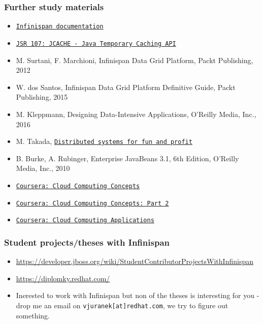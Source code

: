 \documentclass[10pt,utf8]{beamer}
\begin{document}
\begin{frame}
	\frametitle{Further study materials}
	\begin{itemize}
		\item \color{blue}\href{http://infinispan.org/documentation/}{\texttt{Infinispan documentation}}
		\item \href{https://jcp.org/en/jsr/detail?id=107}{\texttt{JSR 107: JCACHE - Java Temporary Caching API}}\color{black}
		\item M. Surtani, F. Marchioni, Infinispan Data Grid Platform,  Packt Publishing, 2012
		\item W. dos Santos, Infinispan Data Grid Platform Definitive Guide, Packt Publishing, 2015
		\item M. Kleppmann, Designing Data-Intensive Applications, O'Reilly Media, Inc., 2016
		\item M. Takada,  \color{blue}\href{http://book.mixu.net/distsys/}{\texttt{Distributed systems for fun and profit}}\color{black}
		\vspace{0.5cm}
		\item  B. Burke, A. Rubinger, Enterprise JavaBeans 3.1, 6th Edition,  O'Reilly Media, Inc., 2010
		\vspace{0.5cm}
		\color{blue}
		\item \href{https://www.coursera.org/course/cloudcomputing}{\texttt{Coursera: Cloud Computing Concepts}}
			\item \href{https://www.coursera.org/course/cloudcomputing2}{\texttt{Coursera: Cloud Computing Concepts: Part 2}}
			\item \href{https://www.coursera.org/course/cloudapplications}{\texttt{Coursera: Cloud Computing Applications}}
	\end{itemize}
\end{frame}

\begin{frame}
	\frametitle{Student projects/theses with Infinispan}
	\begin{itemize}
		\item \scriptsize{\url{https://developer.jboss.org/wiki/StudentContributorProjectsWithInfinispan}}\\
		\item \url{https://diplomky.redhat.com/}
		\item Inerested to work with Infinispan but non of the theses is interesting for you - drop me an email on \texttt{vjuranek[at]redhat.com}, we try to figure out something.
	\end{itemize}
\end{frame}
\end{document}
